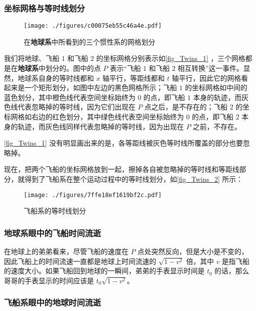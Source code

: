 \subsubsection{坐标网格与等时线划分}

\begin{figure}[ht]
\centering
\texttt{[image: ./figures/c00075eb55c46a4e.pdf]}
\caption{在\textbf{地球系}中所看到的三个惯性系的网格划分} \label{fig_Twins_1}
\end{figure}

我们将地球、飞船 $1$ 和飞船 $2$ 的坐标网格分别表示如\autoref{fig_Twins_1} ，三个网格都是在\textbf{地球系}中划分的。图中的点 $P$ 表示“飞船 $1$ 和飞船 $2$ 相互转换”这一事件。显然，地球系自身的等时线都和 $x$ 轴平行，等距线都和 $t$ 轴平行，因此它的网格看起来是一个矩形划分，如图中左边的黑色网格所示；飞船 $1$ 的坐标网格如中间的蓝色划分，其中橙色线代表空间坐标始终为 $0$ 的点，即飞船 $1$ 本身的轨迹，而灰色线代表忽略掉的等时线，因为它们出现在 $P$ 点之后，是不存在的；飞船 $2$ 的坐标网格如右边的红色划分，其中绿色线代表空间坐标始终为 $0$ 的点，即飞船 $2$ 本身的轨迹，而灰色线同样代表忽略掉的等时线，因为出现在 $P$ 之前，不存在。

\autoref{fig_Twins_1} 没有明显画出来的是，各等距线被灰色等时线所覆盖的部分也要忽略掉。

现在，把两个飞船的坐标网格放到一起，擦掉各自被忽略掉的等时线和等距线部分，就得到了飞船系在整个运动过程中的等时线划分，如\autoref{fig_Twins_2} 所示：

\begin{figure}[ht]
\centering
\texttt{[image: ./figures/7ffe18ef1619bf2c.pdf]}
\caption{飞船系的等时线划分} \label{fig_Twins_2}
\end{figure}

\subsubsection{地球系眼中的飞船时间流逝}

在地球上的弟弟看来，尽管飞船的速度在 $P$ 点处突然反向，但是大小是不变的，因此飞船上的时间流速一直都是地球上时间流速的 $\sqrt{1-v^2}$ 倍，其中 $v$ 是指飞船的速度大小。如果飞船回到地球的一瞬间，弟弟的手表显示时间是 $t_0$ 的话，那么哥哥的手表显示的时间应该是 $t_0\sqrt{1-v^2}$。

\subsubsection{飞船系眼中的地球时间流逝}


